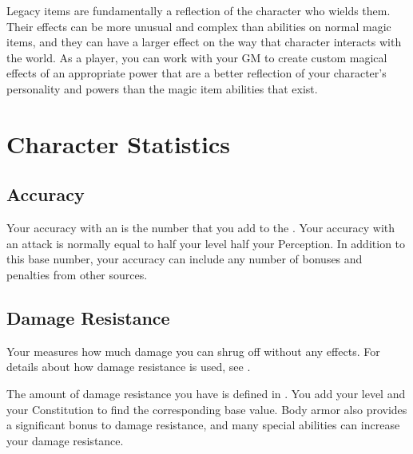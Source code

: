             Legacy items are fundamentally a reflection of the character who wields them.
            Their effects can be more unusual and complex than abilities on normal magic items, and they can have a larger effect on the way that character interacts with the world.
            As a player, you can work with your GM to create custom magical effects of an appropriate power that are a better reflection of your character's personality and powers than the magic item abilities that exist.

\section{Character Statistics}\label{Character Statistics}

    \subsection{Accuracy}\label{Accuracy}
        Your accuracy with an  is the number that you add to the .
        Your accuracy with an attack is normally equal to half your level \add half your Perception.
        In addition to this base number, your accuracy can include any number of bonuses and penalties from other sources.

    \subsection{Damage Resistance}\label{Damage Resistance}
        Your  measures how much damage you can shrug off without any effects.
        For details about how damage resistance is used, see .

        The amount of damage resistance you have is defined in .
        You add your level and your Constitution to find the corresponding base value.
        Body armor also provides a significant bonus to damage resistance, and many special abilities can increase your damage resistance.

